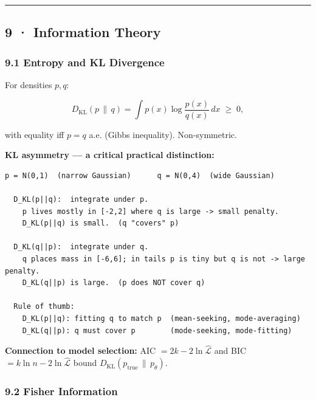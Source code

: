 \documentclass[11pt,a4paper]{article}
\begin{document}
\begin{center}\rule{0.5\linewidth}{0.5pt}\end{center}

\subsection{9 · Information Theory}\label{information-theory}

\subsubsection{9.1 Entropy and KL Divergence}\label{entropy-and-kl-divergence}

\begin{tcolorbox}[colback=defbg!60,colframe=optblue,fonttitle=\bfseries\sffamily,title={\textsf{\textbf{Definition}} — Definition — KL Divergence},breakable]
For densities $p, q$:

$$D_{\mathrm{KL}}(p\,\|\,q) = \int p(x)\log\frac{p(x)}{q(x)}\,dx \;\ge\; 0,$$

with equality iff $p=q$ a.e. (Gibbs inequality).  Non-symmetric.
\end{tcolorbox}

\textbf{KL asymmetry --- a critical practical distinction:}

\begin{verbatim}
p = N(0,1)  (narrow Gaussian)      q = N(0,4)  (wide Gaussian)

  D_KL(p||q):  integrate under p.
    p lives mostly in [-2,2] where q is large -> small penalty.
    D_KL(p||q) is small.  (q "covers" p)

  D_KL(q||p):  integrate under q.
    q places mass in [-6,6]; in tails p is tiny but q is not -> large penalty.
    D_KL(q||p) is large.  (p does NOT cover q)

  Rule of thumb:
    D_KL(p||q): fitting q to match p  (mean-seeking, mode-averaging)
    D_KL(q||p): q must cover p        (mode-seeking, mode-fitting)
\end{verbatim}

\textbf{Connection to model selection:} AIC \(= 2k - 2\ln\hat{\mathcal{L}}\) and BIC \(= k\ln n - 2\ln\hat{\mathcal{L}}\) bound \(D_{\mathrm{KL}}(p_{\text{true}}\,\|\,p_\theta)\).

\subsubsection{9.2 Fisher Information}\label{fisher-information}
\end{document}
